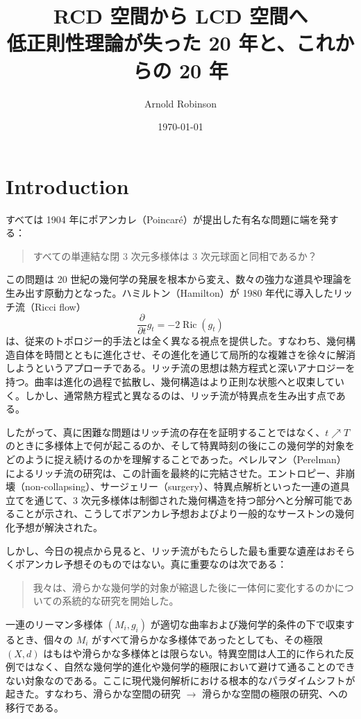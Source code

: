 \documentclass[lualatex]{ltjsarticle}
\title{
    RCD 空間から LCD 空間へ\\[0.5em]
    \large 低正則性理論が失った 20 年と、これからの 20 年
}
\author{Arnold Robinson}
\date{\today}
\begin{document}
\maketitle

\section{Introduction}

すべては 1904 年にポアンカレ（Poincar\'e）が提出した有名な問題に端を発する：

\begin{quote}
すべての単連結な閉 3 次元多様体は 3 次元球面と同相であるか？
\end{quote}

この問題は 20 世紀の幾何学の発展を根本から変え、数々の強力な道具や理論を生み出す原動力となった。ハミルトン（Hamilton）が 1980 年代に導入したリッチ流（Ricci flow）
\[
    \frac{\partial}{\partial t} g_t = -2\operatorname{Ric}(g_t)
\]
は、従来のトポロジー的手法とは全く異なる視点を提供した。すなわち、幾何構造自体を時間とともに進化させ、その進化を通じて局所的な複雑さを徐々に解消しようというアプローチである。リッチ流の思想は熱方程式と深いアナロジーを持つ。曲率は進化の過程で拡散し、幾何構造はより正則な状態へと収束していく。しかし、通常熱方程式と異なるのは、リッチ流が特異点を生み出す点である。

したがって、真に困難な問題はリッチ流の存在を証明することではなく、$t \nearrow T$ のときに多様体上で何が起こるのか、そして特異時刻の後にこの幾何学的対象をどのように捉え続けるのかを理解することであった。ペレルマン（Perelman）によるリッチ流の研究は、この計画を最終的に完結させた。エントロピー、非崩壊（non-collapsing）、サージェリー（surgery）、特異点解析といった一連の道具立てを通じて、3 次元多様体は制御された幾何構造を持つ部分へと分解可能であることが示され、こうしてポアンカレ予想およびより一般的なサーストンの幾何化予想が解決された。

しかし、今日の視点から見ると、リッチ流がもたらした最も重要な遺産はおそらくポアンカレ予想そのものではない。真に重要なのは次である：

\begin{quote}
我々は、滑らかな幾何学的対象が縮退した後に一体何に変化するのかについての系統的な研究を開始した。
\end{quote}

一連のリーマン多様体 $(M_i,g_i)$ が適切な曲率および幾何学的条件の下で収束するとき、個々の $M_i$ がすべて滑らかな多様体であったとしても、その極限 $(X,d)$ はもはや滑らかな多様体とは限らない。特異空間は人工的に作られた反例ではなく、自然な幾何学的進化や幾何学的極限において避けて通ることのできない対象なのである。ここに現代幾何解析における根本的なパラダイムシフトが起きた。すなわち、滑らかな空間の研究 $\longrightarrow$ 滑らかな空間の極限の研究、への移行である。
\end{document}

